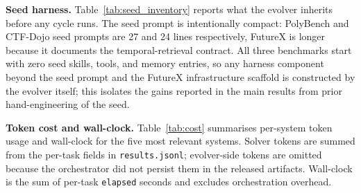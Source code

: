 \documentclass[11pt]{article}
\theoremstyle{plain}
\begin{document}
\noindent\textbf{Seed harness.}
Table~\ref{tab:seed_inventory} reports what the evolver inherits before any cycle runs. The seed prompt is intentionally compact: PolyBench and CTF-Dojo seed prompts are 27 and 24 lines respectively, FutureX is longer because it documents the temporal-retrieval contract. All three benchmarks start with zero seed skills, tools, and memory entries, so any harness component beyond the seed prompt and the FutureX infrastructure scaffold is constructed by the evolver itself; this isolates the gains reported in the main results from prior hand-engineering of the seed.


\begin{table}[t]
\centering\footnotesize
\setlength{\tabcolsep}{6pt}
\caption{Seed harness shipped to the evolver before any cycle runs. \emph{Skills} counts top-level skill directories; \emph{Memory} counts JSONL entries; \emph{Infra} indicates whether the seed includes an infrastructure directory.}
\label{tab:seed_inventory}
\end{table}


\noindent\textbf{Token cost and wall-clock.}
Table~\ref{tab:cost} summarises per-system token usage and wall-clock for the five most relevant systems. Solver tokens are summed from the per-task fields in \texttt{results.jsonl}; evolver-side tokens are omitted because the orchestrator did not persist them in the released artifacts. Wall-clock is the sum of per-task \texttt{elapsed} seconds and excludes orchestration overhead.
\end{document}
